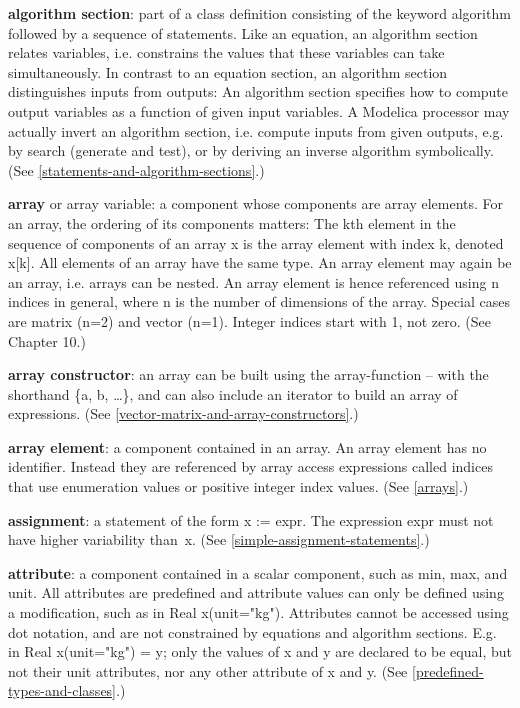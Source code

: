 \documentclass[10pt,a4paper]{report}
\begin{document}
\textbf{algorithm section}: part of a class definition consisting of the
keyword algorithm followed by a sequence of statements. Like an
equation, an algorithm section relates variables, i.e. constrains the
values that these variables can take simultaneously. In contrast to an
equation section, an algorithm section distinguishes inputs from
outputs: An algorithm section specifies how to compute output variables
as a function of given input variables. A Modelica processor may
actually invert an algorithm section, i.e. compute inputs from given
outputs, e.g. by search (generate and test), or by deriving an inverse
algorithm symbolically. (See \ref{statements-and-algorithm-sections}.)

\textbf{array} or array variable: a component whose components are array
elements. For an array, the ordering of its components matters: The kth
element in the sequence of components of an array x is the array element
  with index k, denoted x{[}k{]}. All elements of an array have the same
  type. An array element may again be an array, i.e. arrays can be nested.
An array element is hence referenced using n indices in general, where n
is the number of dimensions of the array. Special cases are matrix (n=2)
and vector (n=1). Integer indices start with 1, not zero. (See Chapter
10.)

\textbf{array constructor}: an array can be built using the
array-function -- with the shorthand \{a, b, \ldots{}\}, and can also
include an iterator to build an array of expressions. (See \ref{vector-matrix-and-array-constructors}.)

\textbf{array element}: a component contained in an array. An array
element has no identifier. Instead they are referenced by array access
expressions called indices that use enumeration values or positive
integer index values. (See \ref{arrays}.)

\textbf{assignment}: a statement of the form x := expr. The expression
expr must not have higher variability than~x. (See \ref{simple-assignment-statements}.)

\textbf{attribute}: a component contained in a scalar component, such as
min, max, and unit. All attributes are predefined and attribute values
can only be defined using a modification, such as in Real x(unit="kg").
Attributes cannot be accessed using dot notation, and are not
constrained by equations and algorithm sections. E.g. in Real
x(unit="kg") = y; only the values of x and y are declared to be equal,
but not their unit attributes, nor any other attribute of x and y. (See
\ref{predefined-types-and-classes}.)
\end{document}
